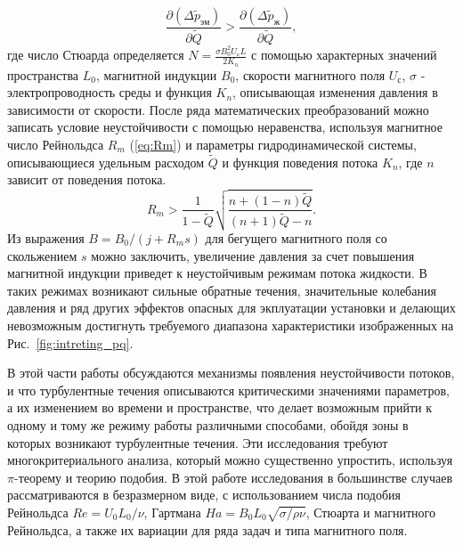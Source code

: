 \begin{equation*}
    \frac{\partial (\Delta \widetilde{p}_{эм})} {\partial \widetilde{Q}} > \frac{\partial (\Delta \widetilde{p}_{ж})} {\partial \widetilde{Q}},
\end{equation*}
где число Стюарда определяется $N = \frac{\sigma B_{0}^2 U_{с} L}{2K_{n}}$ с помощью характерных значений пространства $L_0$, магнитной индукции $B_{0}$, скорости магнитного поля $U_{с}$, $\sigma$ - электропроводность среды и функция $K_{n}$, описывающая изменения давления в зависимости от скорости. После ряда математических преобразований можно записать условие неустойчивости с помощью неравенства, используя магнитное число Рейнольдса $R_{m}$ (\ref{eq:Rm}) и параметры гидродинамической системы, описывающиеся удельным расходом $\widetilde{Q}$ и функция поведения потока $K_n$, где $n$ зависит от поведения потока. 
\begin{equation}
    R_m > \frac{1}{1-\widetilde{Q}} \sqrt{\frac{n+(1-n) \widetilde{Q}}{(n+1)\widetilde{Q}-n}}.
    \label{eq:Rm}
\end{equation}
Из выражения $B = B_{0} / (j + R_{m}s)$ для бегущего магнитного поля со скольжением $s$ можно заключить, увеличение давления за счет повышения магнитной индукции приведет к  неустойчивым режимам потока жидкости. В таких режимах возникают сильные обратные течения, значительные колебания давления и ряд других эффектов опасных для экплуатации установки и делающих невозможным достигнуть требуемого диапазона характеристики изображенных на Рис.~\ref{fig:intreting_pq}. 

В этой части работы обсуждаются механизмы появления неустойчивости потоков, и что турбулентные течения описываются критическими значениями параметров, а их изменением во времени и пространстве, что делает возможным прийти к одному и тому же режиму работы различными способами, обойдя зоны в которых возникают турбулентные течения. Эти исследования требуют многокритериального анализа, который можно существенно упростить, используя $\pi$-теорему и теорию подобия. В этой работе исследования в большинстве случаев рассматриваются в безразмерном виде, с использованием числа подобия Рейнольдса $Re= U_{0} L_{0}/ \nu$, Гартмана $Ha = B_{0} L_{0} \sqrt{\sigma/ \rho \nu}$, Стюарта и магнитного Рейнольдса, а также их вариации для ряда задач и типа магнитного поля. 


